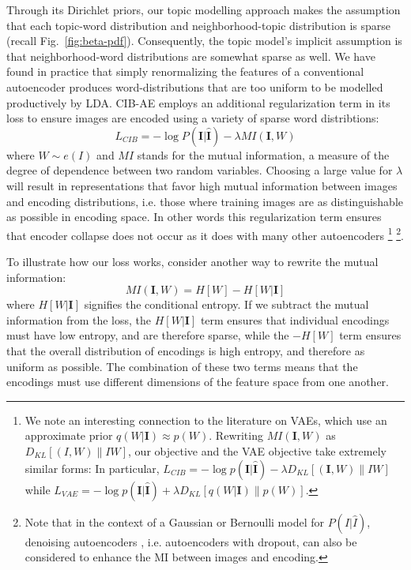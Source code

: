 Through its Dirichlet priors, our topic modelling approach makes the assumption that each topic-word distribution and neighborhood-topic distribution is sparse (recall Fig.~\ref{fig:beta-pdf}). Consequently, the topic model's implicit assumption is that neighborhood-word distributions are somewhat sparse as well.
We have found in practice that simply renormalizing the features of a conventional autoencoder produces word-distributions that are too uniform to be modelled productively by LDA. CIB-AE employs an additional regularization term in its loss to ensure images are encoded using a variety of sparse word distribtions:
\begin{equation}
    L_{CIB} = -\log P(\mathbf{I} | \mathbf{\hat{I}}) - \lambda MI\left(\mathbf{I}, W\right)
\end{equation}
where $W \sim e(I)$ and $MI$ stands for the mutual information, a measure of the degree of dependence between two random variables. Choosing a large value for $\lambda$ will result in representations that favor high mutual information between images and encoding distributions, i.e. those where training images are as distinguishable as possible in encoding space. In other words this regularization term ensures that encoder collapse does not occur as it does with many other autoencoders \footnote{We note an interesting connection to the literature on VAEs, which use an approximate prior $q(W|\mathbf{I}) \approx p(W)$. Rewriting $MI\left(\mathbf{I}, W\right)$ as $D_{KL}[(I,W) \| IW ]$, our objective and the VAE objective take extremely similar forms: In particular, $L_{CIB} = -\log p(\mathbf{I} | \mathbf{\hat{I}}) - \lambda D_{KL}[(\mathbf{I},W) \| IW ]$ while $L_{VAE} = -\log p(\mathbf{I} | \mathbf{\hat{I}}) + \lambda D_{KL}[q(W|\mathbf{I}) \| p(W) ]$.} \footnote{Note that in the context of a Gaussian or Bernoulli model for $P(I|\hat{I})$, denoising autoencoders \citep{vincent2010stacked}, i.e. autoencoders with dropout, can also be considered to enhance the MI between images and encoding.}.

To illustrate how our loss works, consider another way to rewrite the mutual information:
\begin{equation}
MI\left(\mathbf{I}, W\right) = H[W] - H[W | \mathbf{I}]
\end{equation}
where $H[W | \mathbf{I}]$ signifies the conditional entropy. If we subtract the mutual information from the loss, the $H[W | \mathbf{I}]$ term ensures that individual encodings must have low entropy, and are therefore sparse, while the $-H[W]$ term ensures that the overall distribution of encodings is high entropy, and therefore as uniform as possible. The combination of these two terms means that the encodings must use different dimensions of the feature space from one another.

